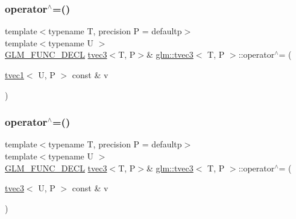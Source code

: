 \subsubsection{\texorpdfstring{operator$^\wedge$=()}{operator^=()}\hspace{0.1cm}{\footnotesize\ttfamily [2/6]}}
{\footnotesize\ttfamily template$<$typename T, precision P = defaultp$>$ \\
template$<$typename U $>$ \\
\mbox{\hyperlink{setup_8hpp_ab2d052de21a70539923e9bcbf6e83a51}{G\+L\+M\+\_\+\+F\+U\+N\+C\+\_\+\+D\+E\+CL}} \mbox{\hyperlink{structglm_1_1tvec3}{tvec3}}$<$T, P$>$\& \mbox{\hyperlink{structglm_1_1tvec3}{glm\+::tvec3}}$<$ T, P $>$\+::operator$^\wedge$= (\begin{DoxyParamCaption}\item[{\mbox{\hyperlink{structglm_1_1tvec1}{tvec1}}$<$ U, P $>$ const \&}]{v }\end{DoxyParamCaption})}

\mbox{\label{structglm_1_1tvec3_a31247f55bc34542e94c0928ad1c1e5e5}} 
\subsubsection{\texorpdfstring{operator$^\wedge$=()}{operator^=()}\hspace{0.1cm}{\footnotesize\ttfamily [3/6]}}
{\footnotesize\ttfamily template$<$typename T, precision P = defaultp$>$ \\
template$<$typename U $>$ \\
\mbox{\hyperlink{setup_8hpp_ab2d052de21a70539923e9bcbf6e83a51}{G\+L\+M\+\_\+\+F\+U\+N\+C\+\_\+\+D\+E\+CL}} \mbox{\hyperlink{structglm_1_1tvec3}{tvec3}}$<$T, P$>$\& \mbox{\hyperlink{structglm_1_1tvec3}{glm\+::tvec3}}$<$ T, P $>$\+::operator$^\wedge$= (\begin{DoxyParamCaption}\item[{\mbox{\hyperlink{structglm_1_1tvec3}{tvec3}}$<$ U, P $>$ const \&}]{v }\end{DoxyParamCaption})}

\mbox{\label{structglm_1_1tvec3_a2cde30e231cec7c356125b3fa4b7fe31}} 

